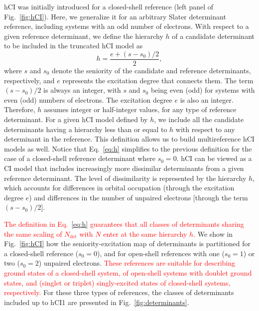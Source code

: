 \documentclass[aip,jcp,reprint,noshowkeys,superscriptaddress]{revtex4-1}
\newcommand{\titou}[1]{\textcolor{red}{#1}}
\newcommand{\Ndet}{N_\text{det}}
\begin{document}
hCI was initially introduced for a closed-shell reference (left panel of Fig.~\ref{fig:hCI}). \cite{Kossoski_2022}
Here, we generalize it for an arbitrary Slater determinant reference, including systems with an odd number of electrons.
With respect to a given reference determinant, we define the hierarchy $h$ of a candidate determinant to be included in the truncated hCI model as
\begin{equation}
  \label{eq:h}
  h = \frac{e+ (s-s_0)/2}{2},
\end{equation}
where $s$ and $s_0$ denote the seniority of the candidate and reference determinants, respectively, and $e$ represents the excitation degree that connects them.
The term $(s-s_0)/2$ is always an integer, with $s$ and $s_0$ being even (odd) for systems with even (odd) numbers of electrons. The excitation degree $e$ is also an integer.
Therefore, $h$ assumes integer or half-integer values, for any type of reference determinant.
For a given hCI model defined by $h$, we include all the candidate determinants having a hierarchy less than or equal to $h$ with respect to any determinant in the reference.
This definition allows us to build multireference hCI models as well.
Notice that Eq.~\eqref{eq:h} simplifies to the previous definition \cite{Kossoski_2022} for the case of a closed-shell reference determinant where $s_0 = 0$.
hCI can be viewed as a CI model that includes increasingly more dissimilar determinants from a given reference determinant.
The level of dissimilarity is represented by the hierarchy $h$, which accounts for differences in orbital occupation (through the excitation degree $e$)
and differences in the number of unpaired electrons [through the term $(s-s_0)/2$].

\titou{The definition in Eq.~\eqref{eq:h} guarantees that all classes of determinants sharing the same scaling of $\Ndet$ with $N$ enter at the same hierarchy $h$.}
We show in Fig.~\ref{fig:hCI} how the seniority-excitation map of determinants is partitioned for a closed-shell reference ($s_0 = 0$), and for open-shell references with one ($s_0 = 1$) or two ($s_0 = 2$) unpaired electrons.
\titou{These references are suitable for describing ground states of a closed-shell system, of open-shell systems with doublet ground states, and (singlet or triplet) singly-excited states of closed-shell systems, respectively.}
For these three types of references, the classes of determinants included up to hCI1 are presented in Fig.~\ref{fig:determinants}.
\end{document}
